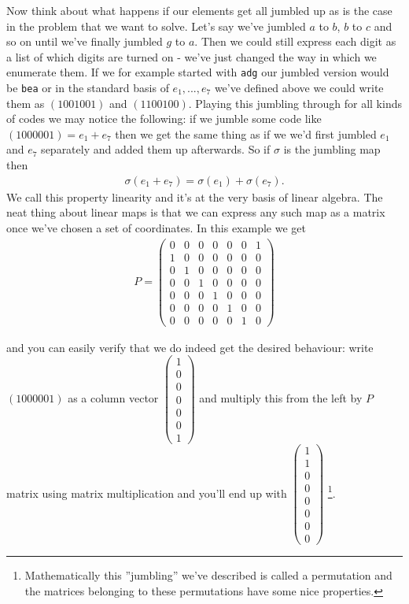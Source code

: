 \documentclass[a4paper,11pt]{article}
\begin{document}
Now think about what happens if our elements get all jumbled up as is the case in the problem that we want to solve. Let's say we've jumbled $a$ to $b$, $b$ to $c$ and so on until we've finally jumbled $g$ to $a$. Then we could still express each digit as a list of which digits are turned on - we've just changed the way in which we enumerate them. If we for example started with \texttt{adg} our jumbled version would be \texttt{bea} or in the standard basis of $e_1, ..., e_7$ we've defined above we could write them as $(1001001)$ and $(1100100)$. Playing this jumbling through for all kinds of codes we may notice the following: if we jumble some code like $(1000001)=e_1+e_7$ then we get the same thing as if we we'd first jumbled $e_1$ and $e_7$ separately and added them up afterwards. So if $\sigma$ is the jumbling map then
\begin{align*}
    \sigma(e_1+e_7) = \sigma(e_1) + \sigma(e_7).
\end{align*}
We call this property linearity and it's at the very basis of linear algebra. The neat thing about linear maps is that we can express any such map as a matrix once we've chosen a set of coordinates. In this example we get
\begin{align*}
    P = \begin{pmatrix}
        0 & 0 & 0 & 0 & 0 & 0 & 1 \\
        1 & 0 & 0 & 0 & 0 & 0 & 0 \\
        0 & 1 & 0 & 0 & 0 & 0 & 0 \\
        0 & 0 & 1 & 0 & 0 & 0 & 0 \\
        0 & 0 & 0 & 1 & 0 & 0 & 0 \\
        0 & 0 & 0 & 0 & 1 & 0 & 0 \\
        0 & 0 & 0 & 0 & 0 & 1 & 0
    \end{pmatrix}
\end{align*}

and you can easily verify that we do indeed get the desired behaviour: write $(1000001)$ as a column vector $\begin{pmatrix}
        1 \\0\\0\\0\\0\\0\\1
    \end{pmatrix}$ and multiply this from the left by $P$ matrix using matrix multiplication and you'll end up with $\begin{pmatrix}
        1 \\1\\0\\0\\0\\0\\0\\0
    \end{pmatrix}$ \footnote{Mathematically this ''jumbling'' we've described is called a permutation and the matrices belonging to these permutations have some nice properties.}.
\end{document}
